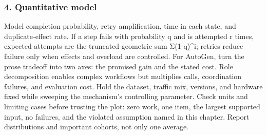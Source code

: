 \subsubsection*{4. Quantitative model}
Model completion probability, retry amplification, time in each state, and duplicate-effect rate. If a step fails with probability q and is attempted r times, expected attempts are the truncated geometric sum Σ(1-q)\textasciicircum{}i; retries reduce failure only when effects and overload are controlled.
For AutoGen, turn the prose tradeoff into two axes: the promised gain and the stated cost. Role decomposition enables complex workflows but multiplies calls, coordination failures, and evaluation cost. Hold the dataset, traffic mix, versions, and hardware fixed while sweeping the mechanism's controlling parameter.
Check units and limiting cases before trusting the plot: zero work, one item, the largest supported input, no failures, and the violated assumption named in this chapter. Report distributions and important cohorts, not only one average.
